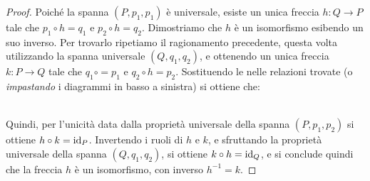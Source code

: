 \begin{proof}
	Poiché la spanna \((P,p_1,p_1)\) è universale, esiste un unica freccia  \(h\colon Q\to P\) tale che \(p_1\circ h=q_1\) e \(p_2\circ h=q_2\). Dimostriamo che \(h\) è un isomorfismo esibendo un suo inverso. Per trovarlo ripetiamo il ragionamento precedente, questa volta utilizzando la spanna universale \((Q,q_1,q_2)\), e ottenendo un unica freccia \(k\colon P\to Q\) tale che \(q_1\circ =p_1\) e \(q_2\circ h=p_2\). Sostituendo le nelle relazioni trovate (o \emph{impastando} i diagrammi in basso a sinistra) si ottiene che:\\[2ex]
	\hfill
	\\[2ex]
	Quindi, per l'unicità data dalla proprietà universale della spanna \((P,p_1,p_2)\) si ottiene \(h\circ k=\mathrm{id}_P\). Invertendo i ruoli di \(h\) e \(k\), e sfruttando la proprietà universale della spanna \((Q,q_1,q_2)\), si ottiene \(k\circ h=\mathrm{id}_Q\), e si conclude quindi che la freccia \(h\) è un isomorfismo, con inverso \(h^{-1}=k\).
\end{proof}
